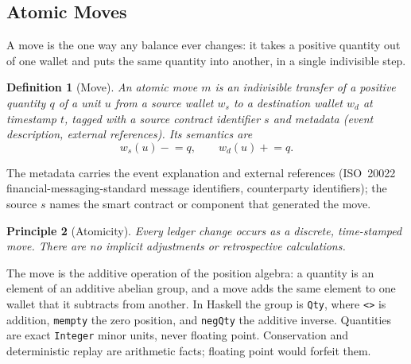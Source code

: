 \documentclass[11pt,a4paper]{article}
\newtheorem{definition}{Definition}[section]
\newtheorem{principle}[definition]{Principle}
\begin{document}
\subsection{Atomic Moves}

A move is the one way any balance ever changes: it takes a positive quantity out of one wallet and puts the same quantity into another, in a single indivisible step.

\begin{definition}[Move]
An atomic move $m$ is an indivisible transfer of a positive quantity $q$ of a unit $u$ from a source wallet $w_s$ to a destination wallet $w_d$ at timestamp $t$, tagged with a source contract identifier $s$ and metadata (event description, external references). Its semantics are
\[
w_s(u) \mathrel{-}= q, \qquad w_d(u) \mathrel{+}= q.
\]
\end{definition}

The metadata carries the event explanation and external references (ISO~20022 financial-messaging-standard message identifiers, counterparty identifiers); the source $s$ names the smart contract or component that generated the move.

\begin{principle}[Atomicity]
Every ledger change occurs as a discrete, time-stamped move. There are no implicit adjustments or retrospective calculations.
\end{principle}

The move is the additive operation of the position algebra: a quantity is an element of an additive abelian group, and a move adds the same element to one wallet that it subtracts from another. In Haskell the group is \texttt{Qty}, where \texttt{<>} is addition, \texttt{mempty} the zero position, and \texttt{negQty} the additive inverse. Quantities are exact \texttt{Integer} minor units, never floating point. Conservation and deterministic replay are arithmetic facts; floating point would forfeit them.
\end{document}
